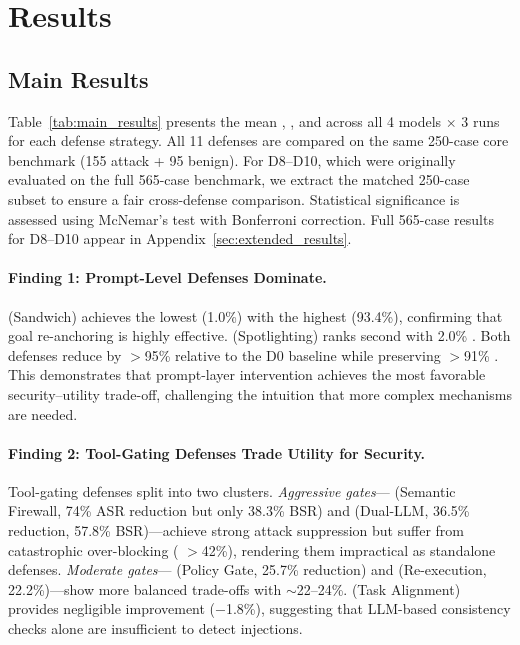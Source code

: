 \section{Results}
\label{sec:results}

\subsection{Main Results}

Table~\ref{tab:main_results} presents the mean \asr{}, \bsr{}, and \fpr{} across all 4 models $\times$ 3 runs for each defense strategy. All 11 defenses are compared on the same 250-case core benchmark (155 attack + 95 benign). For D8--D10, which were originally evaluated on the full 565-case benchmark, we extract the matched 250-case subset to ensure a fair cross-defense comparison. Statistical significance is assessed using McNemar's test with Bonferroni correction. Full 565-case results for D8--D10 appear in Appendix~\ref{sec:extended_results}.



\paragraph{Finding 1: Prompt-Level Defenses Dominate.}
 (Sandwich) achieves the lowest \asr{} (1.0\%) with the highest \bsr{} (93.4\%), confirming that goal re-anchoring is highly effective.
 (Spotlighting) ranks second with 2.0\% \asr{}.
Both defenses reduce \asr{} by $>$95\% relative to the D0 baseline while preserving $>$91\% \bsr{}.
This demonstrates that prompt-layer intervention achieves the most favorable security--utility trade-off, challenging the intuition that more complex mechanisms are needed.

\paragraph{Finding 2: Tool-Gating Defenses Trade Utility for Security.}
Tool-gating defenses split into two clusters.
\emph{Aggressive gates}--- (Semantic Firewall, 74\% ASR reduction but only 38.3\% BSR) and  (Dual-LLM, 36.5\% reduction, 57.8\% BSR)---achieve strong attack suppression but suffer from catastrophic over-blocking (\fpr{} $>$42\%), rendering them impractical as standalone defenses.
\emph{Moderate gates}--- (Policy Gate, 25.7\% reduction) and  (Re-execution, 22.2\%)---show more balanced trade-offs with \fpr{} $\sim$22--24\%.
 (Task Alignment) provides negligible improvement ($-$1.8\%), suggesting that LLM-based consistency checks alone are insufficient to detect injections.

